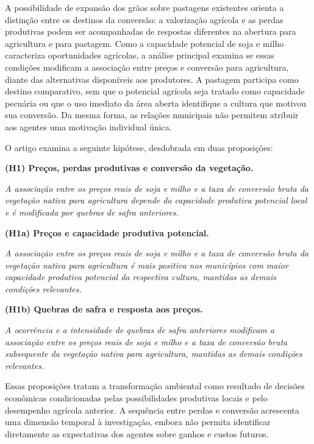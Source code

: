 A possibilidade de expansão dos grãos sobre pastagens existentes orienta a distinção entre os destinos da conversão: a valorização agrícola e as perdas produtivas podem ser acompanhadas de respostas diferentes na abertura para agricultura e para pastagem. Como a capacidade potencial de soja e milho caracteriza oportunidades agrícolas, a análise principal examina se essas condições modificam a associação entre preços e conversão para agricultura, diante das alternativas disponíveis aos produtores. A pastagem participa como destino comparativo, sem que o potencial agrícola seja tratado como capacidade pecuária ou que o uso imediato da área aberta identifique a cultura que motivou sua conversão. Da mesma forma, as relações municipais não permitem atribuir aos agentes uma motivação individual única.

O artigo examina a seguinte hipótese, desdobrada em duas proposições:

\medskip
\noindent\textbf{(H1) Preços, perdas produtivas e conversão da vegetação.}

\noindent\emph{A associação entre os preços reais de soja e milho e a taxa de conversão bruta da vegetação nativa para agricultura depende da capacidade produtiva potencial local e é modificada por quebras de safra anteriores.}

\medskip
\noindent\textbf{(H1a) Preços e capacidade produtiva potencial.}

\noindent\emph{A associação entre os preços reais de soja e milho e a taxa de conversão bruta da vegetação nativa para agricultura é mais positiva nos municípios com maior capacidade produtiva potencial da respectiva cultura, mantidas as demais condições relevantes.}

\medskip
\noindent\textbf{(H1b) Quebras de safra e resposta aos preços.}

\noindent\emph{A ocorrência e a intensidade de quebras de safra anteriores modificam a associação entre os preços reais de soja e milho e a taxa de conversão bruta subsequente da vegetação nativa para agricultura, mantidas as demais condições relevantes.}
\medskip

Essas proposições tratam a transformação ambiental como resultado de decisões econômicas condicionadas pelas possibilidades produtivas locais e pelo desempenho agrícola anterior. A sequência entre perdas e conversão acrescenta uma dimensão temporal à investigação, embora não permita identificar diretamente as expectativas dos agentes sobre ganhos e custos futuros.

